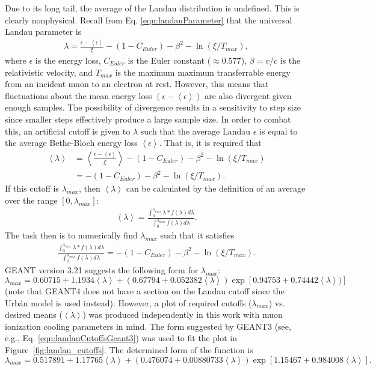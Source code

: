 Due to its long tail, the average of the Landau distribution is undefined. This is clearly nonphysical. Recall from Eq. \eqref{eqn:landauParameter} that the universal Landau parameter is
\begin{align*}
\lambda=\frac{\epsilon-\left<\epsilon\right>}{\xi}-(1-C_{Euler})-\beta ^2 -\ln (\xi/T_{max}),
\end{align*}
where $\epsilon$ is the energy loss, $C_{Euler}$ is the Euler constant ($\approx 0.577$), $\beta=v/c$ is the relativistic velocity, and $T_{max}$ is the maximum maximum transferrable energy from an incident muon to an electron at rest. However, this means that fluctuations about the mean energy loss $\left(\epsilon-\left<\epsilon\right>\right)$ are also divergent given enough samples. The possibility of divergence results in a sensitivity to step size since smaller steps effectively produce a large sample size. In order to combat this, an artificial cutoff is given to $\lambda$ such that the average Landau $\epsilon$ is equal to the average Bethe-Bloch energy loss $\left<\epsilon\right>$. That is, it is required that
\begin{align*}
\left<\lambda\right>&=\left<\frac{\epsilon-\left<\epsilon\right>}{\xi}\right>-(1-C_{Euler})-\beta^2-\ln(\xi/T_{max})\\
&=-(1-C_{Euler})-\beta^2-\ln(\xi/T_{max}).
\end{align*}
If this cutoff is $\lambda_{max}$, then $\left<\lambda\right>$ can be calculated by the definition of an average over the range $[0,\lambda_{max}]$:
\begin{align*}
\left<\lambda\right>=\frac{\int_0 ^{\lambda_{max}} \lambda * f(\lambda) d\lambda}{\int_0 ^{\lambda_{max}}f(\lambda) d\lambda}.
\end{align*}
The task then is to numerically find $\lambda_{max}$ such that it satisfies
\begin{align*}
\frac{\int_0 ^{\lambda_{max}} \lambda * f(\lambda) d\lambda}{\int_0 ^{\lambda_{max}}f(\lambda) d\lambda}=-(1-C_{Euler})-\beta^2-\ln(\xi/T_{max}).
\end{align*}
GEANT version 3.21 \cite{geant3.21} suggests the following form for $\lambda_{max}$:
\begin{equation} \label{eqn:landauCutoffsGeant3}
\lambda_{max}=0.60715+1.1934\left<\lambda\right>+(0.67794+0.052382\left<\lambda\right>)\exp[0.94753+0.74442\left<\lambda\right>)]
\end{equation}
(note that GEANT4 does not have a section on the Landau cutoff since the Urb\'{a}n model is used instead). However, a plot of required cutoffs ($\lambda_{max}$) vs. desired means ($\left<\lambda\right>$) was produced independently in this work with muon ionization cooling parameters in mind. The form suggested by GEANT3 (see, e.g., Eq. \eqref{eqn:landauCutoffsGeant3}) was used to fit the plot in Figure~\ref{fig:landau_cutoffs}. The determined form of the function is
\begin{equation}\label{eqn:landauCutoffs}
\lambda_{max}=0.517891+1.17765\left<\lambda\right>+(0.476074+0.00880733\left<\lambda\right>)\exp[1.15467+0.984008\left<\lambda\right>].
\end{equation}


